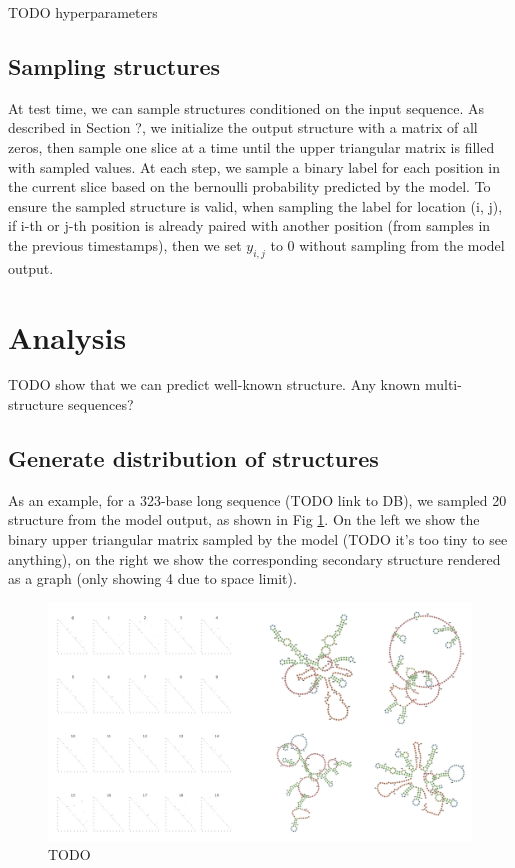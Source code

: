 \documentclass{article}
\begin{document}
TODO hyperparameters





\subsection{Sampling structures}

At test time, we can sample structures conditioned on the input sequence.
As described in Section ?, we initialize the output structure with a matrix of all zeros,
then sample one slice at a time until the upper triangular matrix is filled with sampled values.
At each step, we sample a binary label for each position in the current slice based on the
bernoulli probability predicted by the model.
To ensure the sampled structure is valid, when sampling the label for location (i, j),
if i-th or j-th position is already paired with another position (from samples in the previous timestamps),
then we set $y_{i, j}$ to $0$ without sampling from the model output.

\section{Analysis}

TODO show that we can predict well-known structure.
Any known multi-structure sequences?

\subsection{Generate distribution of structures}

As an example, for a 323-base long sequence (TODO link to DB),
we sampled 20 structure from the model output, as shown in Fig \ref{fig:sampled_structures}.
On the left we show the binary upper triangular matrix sampled by the model (TODO it's too tiny to see anything),
on the right we show the corresponding secondary structure rendered as a graph (only showing 4 due to space limit).


\begin{figure}[h!]
    \centering
    \includegraphics[width=\textwidth]{plot/sampled_structures.png}
    \caption{TODO}
    \label{fig:sampled_structures}
    \centering
\end{figure}
\end{document}
